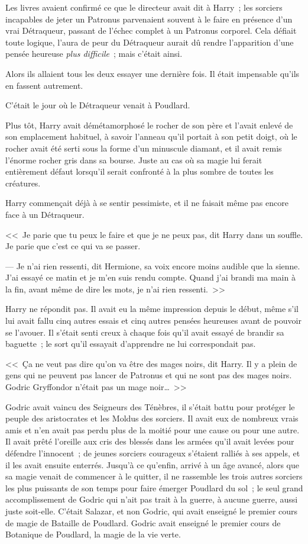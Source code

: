 Les livres avaient confirmé ce que le directeur avait dit à Harry~; les sorciers incapables de jeter un Patronus parvenaient souvent à le faire en présence d'un vrai Détraqueur, passant de l'échec complet à un Patronus corporel. Cela défiait toute logique, l'aura de peur du Détraqueur aurait dû rendre l'apparition d'une pensée heureuse \emph{plus difficile}~; mais c'était ainsi.

Alors ils allaient tous les deux essayer une dernière fois. Il était impensable qu'ils en fassent autrement.

C'était le jour où le Détraqueur venait à Poudlard.

Plus tôt, Harry avait démétamorphosé le rocher de son père et l'avait enlevé de son emplacement habituel, à savoir l'anneau qu'il portait à son petit doigt, où le rocher avait été serti sous la forme d'un minuscule diamant, et il avait remis l'énorme rocher gris dans sa bourse. Juste au cas où sa magie lui ferait entièrement défaut lorsqu'il serait confronté à la plus sombre de toutes les créatures.

Harry commençait déjà à se sentir pessimiste, et il ne faisait même pas encore face à un Détraqueur.

<<~Je parie que tu peux le faire et que je ne peux pas, dit Harry dans un souffle. Je parie que c'est ce qui va se passer.

--- Je n'ai rien ressenti, dit Hermione, sa voix encore moins audible que la sienne. J'ai essayé ce matin et je m'en suis rendu compte. Quand j'ai brandi ma main à la fin, avant même de dire les mots, je n'ai rien ressenti.~>>

Harry ne répondit pas. Il avait eu la même impression depuis le début, même s'il lui avait fallu cinq autres essais et cinq autres pensées heureuses avant de pouvoir se l'avouer. Il s'était senti creux à chaque fois qu'il avait essayé de brandir sa baguette~; le sort qu'il essayait d'apprendre ne lui correspondait pas.

<<~Ça ne veut pas dire qu'on va être des mages noirs, dit Harry. Il y a plein de gens qui ne peuvent pas lancer de Patronus et qui ne sont pas des mages noirs. Godric Gryffondor n'était pas un mage noir…~>>

Godric avait vaincu des Seigneurs des Ténèbres, il s'était battu pour protéger le peuple des aristocrates et les Moldus des sorciers. Il avait eux de nombreux vrais amis et n'en avait pas perdu plus de la moitié pour une cause ou pour une autre. Il avait prêté l'oreille aux cris des blessés dans les armées qu'il avait levées pour défendre l'innocent~; de jeunes sorciers courageux s'étaient ralliés à ses appels, et il les avait ensuite enterrés. Jusqu'à ce qu'enfin, arrivé à un âge avancé, alors que sa magie venait de commencer à le quitter, il ne rassemble les trois autres sorciers les plus puissants de son temps pour faire émerger Poudlard du sol~; le seul grand accomplissement de Godric qui n'ait pas trait à la guerre, à aucune guerre, aussi juste soit-elle. C'était Salazar, et non Godric, qui avait enseigné le premier cours de magie de Bataille de Poudlard. Godric avait enseigné le premier cours de Botanique de Poudlard, la magie de la vie verte.

